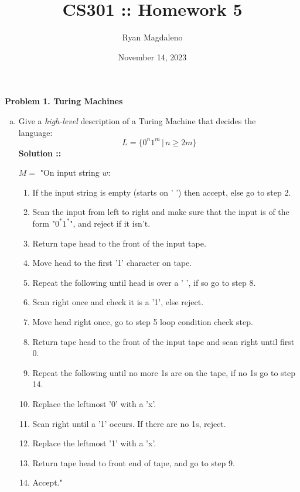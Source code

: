 \documentclass[11pt]{article}
\date{November 14, 2023}
\title{CS301 :: Homework 5}
\author{Ryan Magdaleno}
\begin{document}
\maketitle


\textbf{Problem 1. Turing Machines}

\begin{enumerate}[a)]
    \item
    Give a \textit{high-level} description of a Turing Machine that decides the
    \\ language:
    $$L = \{0^n1^m \,|\, n\ge 2m\}$$
    \vspace{5px}\textbf{Solution ::}

    $M = $ "On input string $w$:
    \begin{enumerate}[\hspace{15px}1.]
        \item
        If the input string is empty (starts on ' ') then accept, else go to step 2.
        \item
        Scan the input from left to right and make sure that the input is of the form
        "$0^*1^*$", and reject if it isn't.
        \item 
        Return tape head to the front of the input tape.
        \item 
        Move head to the first '1' character on tape.
        \item 
        Repeat the following until head is over a ' ', if so go to step 8.
        \item 
        \hspace{15px}Scan right once and check it is a '1', else reject.
        \item 
        \hspace{15px}Move head right once, go to step 5 loop condition check step.
        \item Return tape head to the front of the input tape and scan right until first
        0.
        \item 
        Repeat the following until no more 1s are on the tape, if no 1s go to step 14.
        \item
        \hspace{15px}Replace the leftmost '0' with a 'x'.
        \item 
        \hspace{15px}Scan right until a '1' occurs. If there are no 1s, reject.
        \item
        \hspace{15px}Replace the leftmost '1' with a 'x'.
        \item 
        \hspace{15px}Return tape head to front end of tape, and go to step 9.
        \item
        Accept."
    \end{enumerate}
    \pagebreak


\end{enumerate}
\end{document}
